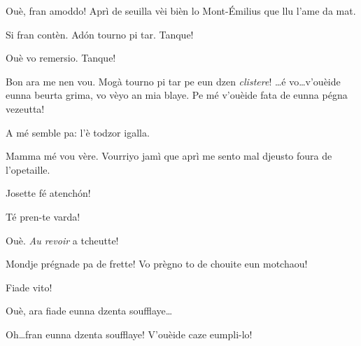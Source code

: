 \begin{drama}
\Eunfeurmispeaks Ouè, fran amoddo! Aprì de seuilla vèi bièn lo Mont-\'Emilius que llu l’ame da mat.

\MedMitchospeaks Si fran contèn. Ad\'on tourno pi tar. Tanque!

\Eunfeurmispeaks Ouè vo remersio. Tanque!


\MedMitchospeaks{} Bon ara me nen vou. Mogà tourno pi tar pe eun dzen \textit{clistere}!  \ldots é vo\ldots v'ouèide eunna beurta grima, vo vèyo an mia blaye. Pe mé v'ouèide fata de eunna pégna vezeutta!

\Gerominespeaks A mé semble pa: l’è todzor igalla.

\Feliespeaks Mamma mé vou vère. Vourriyo jamì que aprì me sento mal djeusto foura de l’opetaille. 

\Gerominespeaks Josette fé atench\'on!


\Gerominespeaks {} Té pren-te varda!

\MedMitchospeaks Ouè.  \textit{Au revoir} a tcheutte!


\scene[-- Lo motchaou]



\Eunfeurmispeaks Mondje prégnade pa de frette! Vo prègno to de chouite eun motchaou!


\PersEmpourtantaspeaks Fiade vito!

\Eunfeurmispeaks Ouè, ara fiade eunna dzenta soufflaye\ldots


\Eunfeurmispeaks Oh\ldots fran eunna dzenta soufflaye! V'ouèide caze eumpli-lo!


\end{drama}
